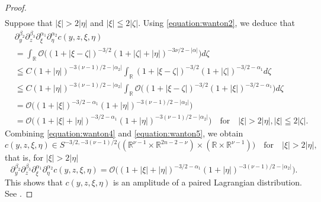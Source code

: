 \documentclass[a4paper,11pt,reqno]{amsart}
\numberwithin{equation}{section}
\theoremstyle{definition}
\theoremstyle{remark}
\begin{document}
\begin{proof}
\begin{align}
\label{equation:wanton4}  
\end{align}
%
%
Suppose that $\lvert\xi\rvert>2\lvert\eta\rvert$ 
and $\lvert\xi\rvert\leqq2\lvert\zeta\rvert$. 
Using \eqref{equation:wanton2}, we deduce that 
%
%
\begin{align}
&  \partial_y^{\beta_2}\partial_z^{\beta_3}\partial_\xi^{\alpha_1}\partial_\eta^{\alpha_2}
  c(y,z,\xi,\eta)
\nonumber
\\
& =
  \int_{\mathbb{R}}
  \mathcal{O}
  \bigl(
  (1+\lvert\xi-\zeta\rvert)^{-3/2}
  (1+\lvert\zeta\rvert+\lvert\eta\rvert)^{-3\nu/2-\lvert\alpha\rvert}
  \bigr)
  d\zeta
\nonumber
\\
& \leqq
  C
  (1+\lvert\eta\rvert)^{-3(\nu-1)/2-\lvert\alpha_2\rvert}
  \int_{\mathbb{R}}
  (1+\lvert\xi-\zeta\rvert)^{-3/2}
  (1+\lvert\zeta\rvert)^{-3/2-\alpha_1}
  d\zeta
\nonumber
\\
& \leqq
  C
  (1+\lvert\eta\rvert)^{-3(\nu-1)/2-\lvert\alpha_2\rvert}
  \int_{\mathbb{R}}
  \mathcal{O}
  \bigl(
  (1+\lvert\xi-\zeta\rvert)^{-3/2}
  (1+\lvert\xi\rvert)^{-3/2-\alpha_1}
  \bigr)
  d\zeta
\nonumber
\\
& =
  \mathcal{O}
  \bigl(
  (1+\lvert\xi\rvert)^{-3/2-\alpha_1}  
  (1+\lvert\eta\rvert)^{-3(\nu-1)/2-\lvert\alpha_2\rvert}
  \bigr)
\nonumber
\\
& =
  \mathcal{O}
  \bigl(
  (1+\lvert\xi\rvert+\lvert\eta\rvert)^{-3/2-\alpha_1}  
  (1+\lvert\eta\rvert)^{-3(\nu-1)/2-\lvert\alpha_2\rvert}
  \bigr)
  \quad\text{for}\quad
  \lvert\xi\rvert>2\lvert\eta\rvert, 
  \lvert\xi\rvert\leqq2\lvert\zeta\rvert. 
\label{equation:wanton5}  
\end{align}
%
%
Combining \eqref{equation:wanton4} and \eqref{equation:wanton5}, we obtain 
%
%
\begin{equation}
c(y,z,\xi,\eta)
\in 
S^{-3/2,-3(\nu-1)/2}
\bigl(
(\mathbb{R}^{\nu-1}\times\mathbb{R}^{2n-2-\nu})
\times
(\mathbb{R}\times\mathbb{R}^{\nu-1})
\bigr) 
\quad
\text{for}
\quad
\lvert\xi\rvert>2\lvert\eta\rvert, 
\label{equation:wanton6}
\end{equation}
%
%
that is, for $\lvert\xi\rvert>2\lvert\eta\rvert$
%
%
$$
\partial_y^{\beta_2}\partial_z^{\beta_3}\partial_\xi^{\alpha_1}\partial_\eta^{\alpha_2}
c(y,z,\xi,\eta)
=
\mathcal{O}
\bigl(
(1+\lvert\xi\rvert+\lvert\eta\rvert)^{-3/2-\alpha_1}  
(1+\lvert\eta\rvert)^{-3(\nu-1)/2-\lvert\alpha_2\rvert}
\bigr). 
$$
%
%
This shows that $c(y,z,\xi,\eta)$ is an amplitude of a paired Lagrangian distribution. 
See \cite{MelroseUhlmann,GuilleminUhlmann,GreenleafUhlmann}. 
%
%
\par

\end{proof}
\end{document}
